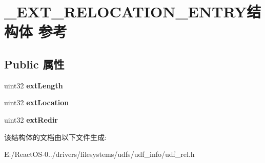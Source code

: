 \hypertarget{struct___e_x_t___r_e_l_o_c_a_t_i_o_n___e_n_t_r_y}{}\section{\+\_\+\+E\+X\+T\+\_\+\+R\+E\+L\+O\+C\+A\+T\+I\+O\+N\+\_\+\+E\+N\+T\+R\+Y结构体 参考}
\label{struct___e_x_t___r_e_l_o_c_a_t_i_o_n___e_n_t_r_y}
\subsection*{Public 属性}
\begin{DoxyCompactItemize}
\item 
\mbox{\label{struct___e_x_t___r_e_l_o_c_a_t_i_o_n___e_n_t_r_y_ac331b1c30f504bb1aa5a702f3dbd907b}} 
uint32 {\bfseries ext\+Length}
\item 
\mbox{\label{struct___e_x_t___r_e_l_o_c_a_t_i_o_n___e_n_t_r_y_a830a43afb36e48d997591c41e067da85}} 
uint32 {\bfseries ext\+Location}
\item 
\mbox{\label{struct___e_x_t___r_e_l_o_c_a_t_i_o_n___e_n_t_r_y_af019b082630834f9d4deba9d5ab1b1c6}} 
uint32 {\bfseries ext\+Redir}
\end{DoxyCompactItemize}


该结构体的文档由以下文件生成\+:\begin{DoxyCompactItemize}
\item 
E\+:/\+React\+O\+S-\/0../drivers/filesystems/udfs/udf\+\_\+info/udf\+\_\+rel.\+h\end{DoxyCompactItemize}
